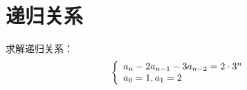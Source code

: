 \documentclass[cn, hazy, blue, normal, 12pt]{elegantnote}
\begin{document}
\section{递归关系}

\begin{exercise}

    求解递归关系：
    \begin{equation}
        \notag
        \left\{\begin{array}{l}
            a_{n}-2 a_{n-1}-3 a_{n-2} = 2 \cdot 3^{n} \\
            a_{0}=1, a_{1}=2
        \end{array}\right.
    \end{equation}

\end{exercise}
\end{document}
